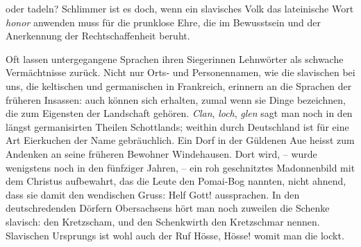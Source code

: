 {oder tadeln? Schlimmer ist es doch, wenn ein slavisches Volk das lateinische Wort \textit{honor} anwenden muss für die prunklose Ehre, \largerpage[1]die im Bewusstsein und der Anerkennung der Rechtschaffenheit beruht.

Oft lassen untergegangene Sprachen ihren Siegerinnen Lehnwörter als schwache Vermächtnisse zurück. Nicht nur Orts- und Personennamen, wie die slavischen bei uns, die keltischen und germanischen in Frankreich, erinnern an die Sprachen der früheren Insassen: auch  können sich erhalten, zumal wenn sie Dinge bezeichnen, die zum Eigensten der Landschaft gehören. \textit{Clan}, \textit{loch}, \textit{glen} sagt man noch in den längst germanisirten Theilen Schottlands; weithin durch Deutschland ist für eine Art Eierkuchen der  Name  gebräuchlich.  Ein Dorf in der Güldenen Aue heisst zum Andenken an seine früheren Bewohner Windehausen. Dort wird, – wurde wenigstens noch in den fünfziger Jahren, – ein roh geschnitztes Madonnenbild mit dem Christus aufbewahrt, das die Leute den Pomai-Bog nannten, nicht ahnend, dass sie damit den wendischen Gruss: Helf Gott! aussprachen. In den deutsch\-\label{fp.261}redenden Dörfern Obersachsens hört man noch zuweilen die Schenke slavisch: den Kretzscham, und den Schenkwirth den Kretzschmar nennen. Slavischen Ursprungs ist wohl auch der Ruf Hösse, Hösse! womit man die   lockt. 

}

